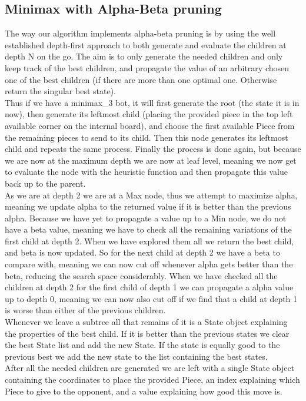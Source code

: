 \documentclass[12pt, a4paper]{article}
\begin{document}
\subsection{Minimax with Alpha-Beta pruning}
The way our algorithm implements alpha-beta pruning is by using the well established depth-first approach to both generate and evaluate the children at depth N on the go. The aim is to only generate the needed children and only keep track of the best children, and propagate the value of an arbitrary chosen one of the best children (if there are more than one optimal one. Otherwise return the singular best state). \\ 
Thus if we have a minimax\_3 bot, it will first generate the root (the state it is in now), then generate its leftmost child (placing the provided piece in the top left available corner on the internal board), and choose the first available Piece from the remaining pieces to send to its child. Then this node generates its leftmost child and repeats the same process. Finally the process is done again, but because we are now at the maximum depth we are now at leaf level, meaning we now get to evaluate the node with the heuristic function and then propagate this value back up to the parent. \\
As we are at depth 2 we are at a Max node, thus we attempt to maximize alpha, meaning we update alpha to the returned value if it is better than the previous alpha. Because we have yet to propagate a value up to a Min node, we do not have a beta value, meaning we have to check all the remaining variations of the first child at depth 2. When we have explored them all we return the best child, and beta is now updated. So for the next child at depth 2 we have a beta to compare with, meaning we can now cut off whenever alpha gets better than the beta, reducing the search space considerably. When we have checked all the children at depth 2 for the first child of depth 1 we can propagate a alpha value up to depth 0, meaning we can now also cut off if we find that a child at depth 1 is worse than either of the previous children. \\
Whenever we leave a subtree all that remains of it is a State object explaining the properties of the best child. If it is better than the previous states we clear the best State list and add the new State. If the state is equally good to the previous best we add the new state to the list containing the best states. \\
After all the needed children are generated we are left with a single State object containing the coordinates to place the provided Piece, an index explaining which Piece to give to the opponent, and a value explaining how good this move is. 
\end{document}
